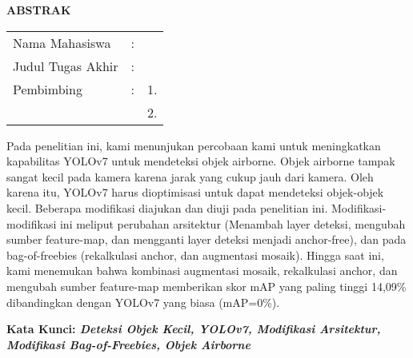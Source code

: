 \begin{center}
  \large\textbf{ABSTRAK}
\end{center}


\vspace{2ex}

\begingroup
\setlength{\tabcolsep}{0pt}

\noindent
\begin{tabularx}{\textwidth}{l >{\centering}m{2em} X}
  Nama Mahasiswa    & : & \name{}         \\

  Judul Tugas Akhir & : & \tatitle{}      \\

  Pembimbing        & : & 1. \advisor{}   \\
                    &   & 2. \coadvisor{} \\
\end{tabularx}
\endgroup

Pada penelitian ini, kami menunjukan percobaan kami untuk meningkatkan kapabilitas YOLOv7
untuk mendeteksi objek airborne. Objek airborne tampak sangat kecil pada kamera karena
jarak yang cukup jauh dari kamera. Oleh karena itu, YOLOv7 harus dioptimisasi untuk
dapat mendeteksi objek-objek kecil. Beberapa modifikasi diajukan dan diuji pada penelitian
ini. Modifikasi-modifikasi ini meliput perubahan arsitektur (Menambah layer deteksi, mengubah
sumber feature-map, dan mengganti layer deteksi menjadi anchor-free), dan pada bag-of-freebies
(rekalkulasi anchor, dan augmentasi mosaik). Hingga saat ini, kami menemukan bahwa kombinasi
augmentasi mosaik, rekalkulasi anchor, dan mengubah sumber feature-map memberikan skor
mAP yang paling tinggi 14,09\% dibandingkan dengan YOLOv7 yang biasa (mAP=0\%).

\noindent
\textbf{Kata Kunci: \emph{Deteksi Objek Kecil, YOLOv7, Modifikasi Arsitektur, Modifikasi Bag-of-Freebies, Objek Airborne}}
